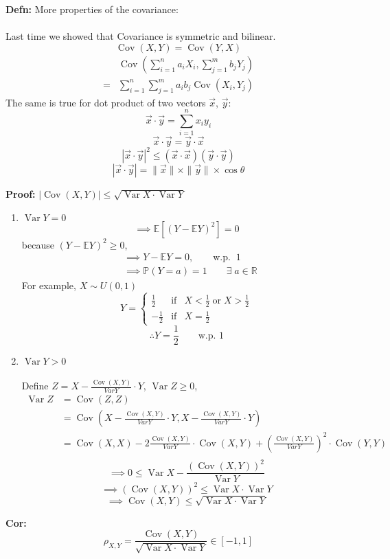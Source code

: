 \documentclass[a4paper]{article}
\newcommand{\n}{\hfill\break}
\newcommand{\defn}[1]{\par\noindent\settowidth{\hangindent}{\textbf{Defn: }}\textbf{Defn: }#1\n}
\newcommand{\cor}[1]{\par\noindent\settowidth{\hangindent}{\textbf{Cor: }}\textbf{Cor: }#1\n}
\newcommand{\pf}[1]{\par\noindent\settowidth{\hangindent}{\textbf{Proof: }}\textbf{Proof: }#1\n}
\newcommand{\reals}{\mathbb{R}}
\newcommand{\R}{\reals}
\newcommand{\Prob}{\mathbb{P}}
\renewcommand{\P}{\Prob}
\newcommand{\Avg}{\mathbb{E}}
\newcommand{\E}{\Avg}
\DeclareMathOperator{\Var}{Var}
\DeclareMathOperator{\Cov}{Cov}
\begin{document}
\defn{
    More properties of the covariance:
    \\\\
    Last time we showed that Covariance is symmetric and bilinear. 
    \[\Cov(X,Y)=\Cov(Y,X)\]
    \begin{align*}
        &\Cov\left(\sum^n_{i=1}a_iX_i, \sum^m_{j=1}b_jY_j\right) \\
        =&\sum^n_{i=1}\sum^m_{j=1}a_ib_j\Cov(X_i,Y_j)
    \end{align*}
    The same is true for dot product of two vectors $\Vec{x}$, $\Vec{y}$:
    \[\Vec{x}\cdot\Vec{y}=\sum^n_{i=1}x_iy_i\]
    \[\Vec{x}\cdot\Vec{y}=\Vec{y}\cdot\Vec{x}\]
    \[|\Vec{x}\cdot\Vec{y}|^2\leq(\Vec{x}\cdot\Vec{x})(\Vec{y}\cdot\Vec{y})\]
    \[|\Vec{x}\cdot\Vec{y}|=\|\Vec{x}\|\times\|\Vec{y}\|\times\cos\theta\]
}

\pf{
    $|\Cov(X,Y)|\leq\sqrt{\Var X\cdot\Var Y}$
    \begin{enumerate}
        \item $\Var Y=0$
        \[\implies\E[(Y-\E Y)^2]=0\]
        because $(Y-\E Y)^2\geq 0$,
        \begin{align*}
            &\implies Y-\E Y=0, \qquad\text{w.p.}\;\;1 \\
            &\implies \P(Y=a)=1\qquad\exists\;a\in\R
        \end{align*}
        For example, $X\sim U(0,1)$
        \[Y=\left\{\begin{array}{llc}\frac{1}{2}&\text{if}&X<\frac{1}{2}\;\text{or}\;X>\frac{1}{2}\\-\frac{1}{2}&\text{if}&X=\frac{1}{2}\end{array}\right.\]
        \[\therefore Y=\frac{1}{2}\qquad\text{w.p. 1}\]
        \item $\Var Y>0$
        \\\\
        Define $Z=X-\frac{\Cov(X,Y)}{Var Y}\cdot Y$, $\Var Z\geq0$,
        \begin{align*}
            \Var Z&=\Cov(Z,Z) \\
            &=\Cov\left(X-\frac{\Cov(X,Y)}{Var Y}\cdot Y,X-\frac{\Cov(X,Y)}{Var Y}\cdot Y\right) \\
            &=\Cov(X,X)-2\frac{\Cov(X,Y)}{Var Y}\cdot\Cov(X,Y)+\left(\frac{\Cov(X,Y)}{Var Y}\right)^2\cdot\Cov(Y,Y) \\
        \end{align*}
        \[\implies 0\leq\Var X-\frac{(\Cov(X,Y))^2}{\Var Y}\]
        \[\implies (\Cov(X,Y))^2\leq\Var X\cdot\Var Y\]
        \[\implies \Cov(X,Y)\leq\sqrt{\Var X\cdot\Var Y}\]
    \end{enumerate}
}

\cor{
    \[\rho_{X,Y}=\frac{\Cov(X,Y)}{\sqrt{\Var X\cdot\Var Y}}\in[-1,1]\]
}
\end{document}
